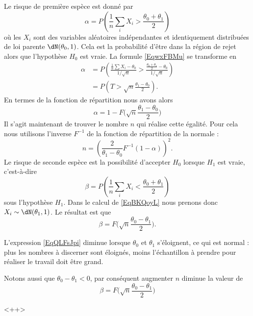 \begin{example}
    Le risque de première espèce est donné par
    \begin{equation}    \label{EqwxFBMu}
        \alpha=P\left( \frac{1}{ n }\sum_iX_i>\frac{ \theta_0+\theta_1 }{2} \right)
    \end{equation}
    où les \( X_i\) sont des variables aléatoires indépendantes et identiquement distribuées de loi parente \( \dN(\theta_0,1)\). Cela est la probabilité d'être dans la région de rejet alors que l'hypothèse \( H_0\) est vraie. La formule \eqref{EqwxFBMu} se transforme en
    \begin{subequations}
        \begin{align}
        \alpha&=P\left( \frac{ \frac{1}{ n }\sum X_i-\theta_0 }{ 1/\sqrt{n} }>\frac{ \frac{ \theta_0+\theta_1 }{2}-\theta_0 }{ 1/\sqrt{n} } \right)\\
        &=P(T>\sqrt{n}\frac{ \theta_1-\theta_0 }{2}).
        \end{align}
    \end{subequations}
    En termes de la fonction de répartition nous avons alors
    \begin{equation}
        \alpha=1-F\big( \sqrt{n}\frac{ \theta_1-\theta_0 }{2} \big)
    \end{equation}
    Il s'agit maintenant de trouver le nombre \( n\) qui réalise cette égalité. Pour cela nous utilisons l'inverse \( F^{-1}\) de la fonction de répartition de la normale :
    \begin{equation}    \label{EqQLFsJpi}
        n=\left( \frac{ 2 }{ \theta_1-\theta_0 }F^{-1}(1-\alpha) \right)^2.
    \end{equation}
    Le risque de seconde espèce est la possibilité d'accepter \( H_0\) lorsque \( H_1\) est vraie, c'est-à-dire
    \begin{equation}        \label{EqBKQoyL}
        \beta=P\left( \frac{1}{ n }\sum_i X_i<\frac{ \theta_0+\theta_1 }{2} \right)
    \end{equation}
    sous l'hypothèse \( H_1\). Dans le calcul de \eqref{EqBKQoyL} nous prenons donc \( X_i\sim\dN(\theta_1,1)\). Le résultat est que
    \begin{equation}
        \beta=F\big( \sqrt{n}\frac{ \theta_0-\theta_1 }{2} \big).
    \end{equation}
    
    \begin{remark}
        L'expression \eqref{EqQLFsJpi} diminue lorsque \( \theta_0\) et \( \theta_1\) s'éloignent, ce qui est normal : plus les nombres à discerner sont éloignés, moins l'échantillon à prendre pour réaliser le travail doit être grand.

        Notons aussi que \( \theta_0-\theta_1<0\), par conséquent augmenter \( n\) diminue la valeur de 
        \begin{equation}
            \beta=F\big( \sqrt{n}\frac{ \theta_0-\theta_1 }{2} \big)
        \end{equation}
    \end{remark}
\end{example}
<++>


